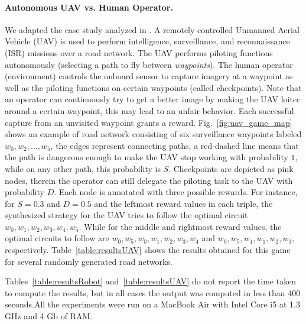 \paragraph{Autonomous UAV vs. Human Operator.} We adapted the case study analyzed in  \cite{DBLP:conf/iccps/FengWHT15}. A remotely controlled Unmanned Aerial Vehicle (UAV) is used to perform intelligence, surveillance, and reconnaissance (ISR) missions over a road network. The UAV performs piloting functions autonomously (selecting a path to fly between \emph{waypoints}). The human operator (environment) controls the onboard sensor to capture imagery at a waypoint as well as the piloting functions on certain waypoints (called checkpoints). Note that an operator can continuously try to get a better image by making the UAV loiter around a certain waypoint, this may lead to an unfair behavior.
Each successful capture from an unvisited waypoint grants a reward.
% 
Fig.~\ref{fig:uav_game_map} shows an example of road network consisting of six surveillance waypoints labeled $w_0,w_2,...,w_5$, the edges represent connecting paths, a red-dashed line means that the path is dangerous enough to make the UAV stop working with probability $1$, while on any other path, this probability is $S$. Checkpoints are depicted as pink nodes, therein the operator can still delegate the piloting task to the UAV with probability $D$. Each node is annotated with three possible rewards. For instance,  for $S=0.3$ and $D=0.5$ and the leftmost reward values in each triple, the synthesized strategy for the UAV tries to follow the optimal circuit $w_0,w_1,w_2,w_3,w_4,w_5$. While for  the middle and  rightmost reward values, the optimal circuits to follow are $w_0,w_5,w_0,w_1,w_2,w_3,w_4$ and $w_0,w_5,w_4,w_1,w_2,w_3$, respectively.   Table~\ref{table:resultsUAV} shows the results obtained for  this game for several randomly generated road networks.

Tables~\ref{table:resultsRobot} and~\ref{table:resultsUAV} do not report the time taken to compute the results,   but in all cases the output was computed in less than 400 seconds.All the experiments were run on a MacBook Air with Intel Core i5 at 1.3 GHz and 4 Gb of RAM. %

